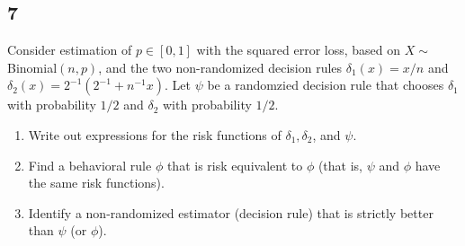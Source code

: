 \documentclass[12pt]{article}
\begin{document}
\newpage
\subsection*{7}
\begin{tcolorbox}
  Consider estimation of $p \in [0,1]$ with the squared error loss, based on $X\sim$Binomial$(n,p)$, and the two non-randomized decision rules
  $\delta_1(x)= x/n$ and $\delta_2(x)= 2^{-1}(  2^{-1} + n^{-1}x)$. Let $\psi$ be a randomzied decision rule that chooses $\delta_1$ with probability $1/2$ and $\delta_2$ with probability $1/2$.

  \begin{enumerate}
    \item Write out expressions for the risk functions of $\delta_1,\delta_2$, and $\psi$.
    \item Find a behavioral rule $\phi$ that is risk equivalent to $\phi$ (that is, $\psi$ and $\phi$ have the same risk functions).
    \item Identify a non-randomized estimator (decision rule) that is strictly better than $\psi$ (or $\phi$).
  \end{enumerate}
\end{tcolorbox}
\end{document}
